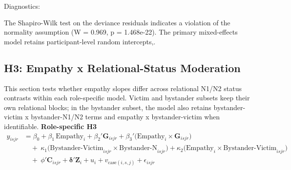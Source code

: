 \documentclass[11pt]{article}
\begin{document}
Diagnostics:

The Shapiro-Wilk test on the deviance residuals indicates a violation of the normality assumption (W = 0.969, p = 1.468e-22). The primary mixed-effects model retains participant-level random intercepts,.



\subsection{H3: Empathy x Relational-Status Moderation}
This section tests whether empathy slopes differ across relational N1/N2 status contrasts within each role-specific model. Victim and bystander subsets keep their own relational blocks; in the bystander subset, the model also retains bystander-victim x bystander-N1/N2 terms and empathy x bystander-victim when identifiable.
\textbf{Role-specific H3}
\[
\begin{aligned}
y_{isjr} &= \beta_0 + \beta_1\,\mathrm{Empathy}_i + \beta_2'\mathbf{G}_{isjr} + \beta_3'\bigl(\mathrm{Empathy}_i\times\mathbf{G}_{isjr}\bigr) \\
&\quad +\ \kappa_1\bigl(\mathrm{Bystander\text{-}Victim}_{isjr}\times\mathrm{Bystander\text{-}N}_{isjr}\bigr) + \kappa_2\bigl(\mathrm{Empathy}_i\times\mathrm{Bystander\text{-}Victim}_{isjr}\bigr) \\
&\quad +\ \phi'\mathbf{C}_{isjr} + \boldsymbol{\delta}'\mathbf{Z}_i + u_i + v_{\mathrm{case}(i,s,j)} + \epsilon_{isjr} \\
\end{aligned}
\]
\end{document}
